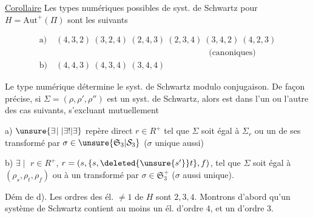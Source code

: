 
\uline{Corollaire} Les types numériques possibles de syst. de Schwartz pour $H=\mathrm{Aut}^{+}(\Pi)$ sont les suivants

\[
\begin{aligned}
\text{a)}\ &(4,3,2)\ (3,2,4)\ (2,4,3)\ (2,3,4)\ (3,4,2)\ (4,2,3)\\
&\hspace{18em}\text{(canoniques)}\\
\text{b)}\ &(4,4,3)\ (4,3,4)\ (3,4,4)
\end{aligned}
\]

Le type numérique détermine le syst. de Schwartz modulo conjugaison. De façon précise, si $\Sigma=(\rho,\rho',\rho'')$ est un syst. de Schwartz, alors  est dans l'un ou l'autre des cas suivants, s'excluant mutuellement

a) $\unsure{\exists\!\mid|\exists!|\exists}$ repère direct $r\in R^{+}$  tel que $\Sigma$ soit égal à $\Sigma_r$ ou un de ses transformé par $\sigma\in\unsure{\mathfrak S_3|\mathcal S_3}$ ($\sigma$ unique aussi)

b) $\exists\!\mid$  $r\in R^{+}$, $r=(s,\{s,\deleted{\unsure{s'}}t\},f)$,  tel que $\Sigma$ soit égal à $(\rho_s,\rho_t,\rho_f)$ ou à un transformé par $\sigma\in\mathfrak S_3^{+}$ ($\sigma$ aussi unique).


Dém de d). Les ordres des él. $\ne1$ de $H$ sont $2,3,4$. Montrons d'abord qu'un système de Schwartz contient au moins un él. d'ordre $4$, et un  d'ordre $3$.

